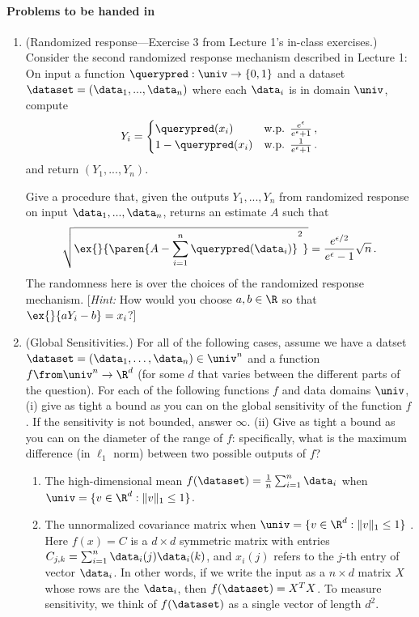 \documentclass[11pt]{article}
\begin{document}
 \paragraph{Problems to be handed in}
\begin{enumerate}[leftmargin=\parindent, itemsep=3ex]
\item (Randomized
  response---Exercise 3 from Lecture 1's in-class exercises.) Consider
  the second randomized response mechanism described in Lecture 1: On
  input a function $\querypred:\univ\to\{0,1\}$ and a dataset $\dataset =
  (\data_1,...,\data_n)$ where each $\data_i$ is in domain $\univ$, compute
  $$Y_i =  \begin{cases}
    \querypred (x_i) & \text{w.p.  } \frac{e^\epsilon}{e^\epsilon+1}\, ,\\
    1-\querypred (x_i) & \text{w.p.  } \frac{1}{e^\epsilon+1} \, .\\
  \end{cases}$$
  and return $ (Y_1,...,Y_n)$.
  
  Give a procedure that, given the outputs $Y_1,...,Y_n$ from randomized response on
  input $\data_1,..., \data_n$, returns an estimate $A$ such that $$\sqrt{\ex{}{\paren{A -
        \sum_{i=1}^n \querypred (\data_i)}^2}} = \frac{e^{\epsilon/2}}{e^\epsilon -1} \sqrt{n}
\, .
$$
The randomness here is over the choices of the randomized response mechanism.
[\emph{Hint:} How would you choose $a,b \in \R$ so that $\ex{}{aY_i-b}
= x_i$?]


\item (Global Sensitivities.) For all of the following cases, assume
  we have a datset $\dataset = (\data_1,\dots,\data_n) \in \univ^n$ and
  a function $f \from \univ^n \to \R^d$ (for some $d$ that varies
  between the different parts of the question).  For each of the
  following functions $f$ and data domains $\univ$,
  (i) give as tight a bound as you can on the global sensitivity of
  the function $f$.  If the sensitivity is not bounded, answer
  $\infty$. (ii) Give as tight a bound as you can on the diameter of
  the range of $f$: specifically,
  what is the maximum difference (in $\ell_1$ norm) between two possible outputs of $f$? 

    \begin{enumerate}
    \item The high-dimensional mean $f(\dataset) = \frac 1 n \sum_{i=1}^n \data_i$ when 
      $\univ = \{v \in \R^d: \|v\|_1\leq 1\}$.
    
    \item The unnormalized covariance matrix when
      $\univ = \{v \in \R^d: \|v\|_1\leq 1\}$ . Here $f(x)=C$ is a
      $d\times d$ symmetric matrix with entries
      $C_{j,k}=\sum_{i=1}^n \data_i(j) \data_i(k)$, and $x_i(j)$
      refers to the $j$-th entry of vector $\data_i$. In other words, if we write
      the input as a $n\times d$ matrix $X$ whose rows are the $\data_i$,
      then $f(\dataset) = X^T X$. To measure sensitivity, we think of $f(\dataset)$
      as a single vector of length $d^2$. 


\end{enumerate}
\end{enumerate}
\end{document}

